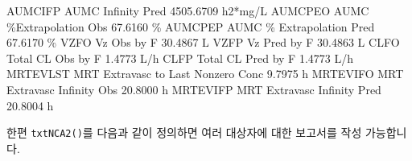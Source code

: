 \documentclass[
  12pt,
]{krantz}
\newenvironment{Shaded}{\begin{snugshade}}{\end{snugshade}}
\newcommand{\CharTok}[1]{\textcolor[rgb]{0.31,0.60,0.02}{#1}}
\newcommand{\ControlFlowTok}[1]{\textcolor[rgb]{0.13,0.29,0.53}{\textbf{#1}}}
\newcommand{\DataTypeTok}[1]{\textcolor[rgb]{0.13,0.29,0.53}{#1}}
\newcommand{\DecValTok}[1]{\textcolor[rgb]{0.00,0.00,0.81}{#1}}
\newcommand{\ExtensionTok}[1]{#1}
\newcommand{\KeywordTok}[1]{\textcolor[rgb]{0.13,0.29,0.53}{\textbf{#1}}}
\newcommand{\NormalTok}[1]{#1}
\newcommand{\OperatorTok}[1]{\textcolor[rgb]{0.81,0.36,0.00}{\textbf{#1}}}
\newcommand{\StringTok}[1]{\textcolor[rgb]{0.31,0.60,0.02}{#1}}
\begin{document}
\begin{Shaded}
\begin{Highlighting}[]
\ExtensionTok{AUMCIFP}\NormalTok{    AUMC Infinity Pred                           4505.6709 h2*mg/L}
\ExtensionTok{AUMCPEO}\NormalTok{    AUMC \%Extrapolation Obs                        67.6160 \%}
\ExtensionTok{AUMCPEP}\NormalTok{    AUMC \% Extrapolation Pred                      67.6170 \%}
\ExtensionTok{VZFO}\NormalTok{       Vz Obs by F                                    30.4867 L}
\ExtensionTok{VZFP}\NormalTok{       Vz Pred by F                                   30.4863 L}
\ExtensionTok{CLFO}\NormalTok{       Total CL Obs by F                               1.4773 L/h}
\ExtensionTok{CLFP}\NormalTok{       Total CL Pred by F                              1.4773 L/h}
\ExtensionTok{MRTEVLST}\NormalTok{   MRT Extravasc to Last Nonzero Conc              9.7975 h}
\ExtensionTok{MRTEVIFO}\NormalTok{   MRT Extravasc Infinity Obs                     20.8000 h}
\ExtensionTok{MRTEVIFP}\NormalTok{   MRT Extravasc Infinity Pred                    20.8004 h}
\end{Highlighting}
\end{Shaded}

한편 \texttt{txtNCA2()}를 다음과 같이 정의하면 여러 대상자에 대한 보고서를 작성 가능합니다.

\begin{Shaded}
\end{Shaded}
\end{document}
